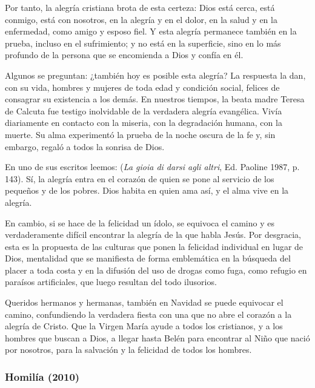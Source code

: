 \begin{body}
\begin{body}
Por tanto, la alegría cristiana brota de esta certeza: Dios está cerca, está conmigo, está con nosotros, en la alegría y en el dolor, en la salud y en la enfermedad, como amigo y esposo fiel. Y esta alegría permanece también en la prueba, incluso en el sufrimiento; y no está en la superficie, sino en lo más profundo de la persona que se encomienda a Dios y confía en él.

Algunos se preguntan: ¿también hoy es posible esta alegría? La respuesta la dan, con su vida, hombres y mujeres de toda edad y condición social, felices de consagrar su existencia a los demás. En nuestros tiempos, la beata madre Teresa de Calcuta fue testigo inolvidable de la verdadera alegría evangélica. Vivía diariamente en contacto con la miseria, con la degradación humana, con la muerte. Su alma experimentó la prueba de la noche oscura de la fe y, sin embargo, regaló a todos la sonrisa de Dios.

En uno de sus escritos leemos:  (\emph{La gioia di darsi agli altri}, Ed. Paoline 1987, p. 143). Sí, la alegría entra en el corazón de quien se pone al servicio de los pequeños y de los pobres. Dios habita en quien ama así, y el alma vive en la alegría.

En cambio, si se hace de la felicidad un ídolo, se equivoca el camino y es verdaderamente difícil encontrar la alegría de la que habla Jesús. Por desgracia, esta es la propuesta de las culturas que ponen la felicidad individual en lugar de Dios, mentalidad que se manifiesta de forma emblemática en la búsqueda del placer a toda costa y en la difusión del uso de drogas como fuga, como refugio en paraísos artificiales, que luego resultan del todo ilusorios.

Queridos hermanos y hermanas, también en Navidad se puede equivocar el camino, confundiendo la verdadera fiesta con una que no abre el corazón a la alegría de Cristo. Que la Virgen María ayude a todos los cristianos, y a los hombres que buscan a Dios, a llegar hasta Belén para encontrar al Niño que nació por nosotros, para la salvación y la felicidad de todos los hombres.


\subsubsection{Homilía (2010)}


\end{body}
\end{body}
